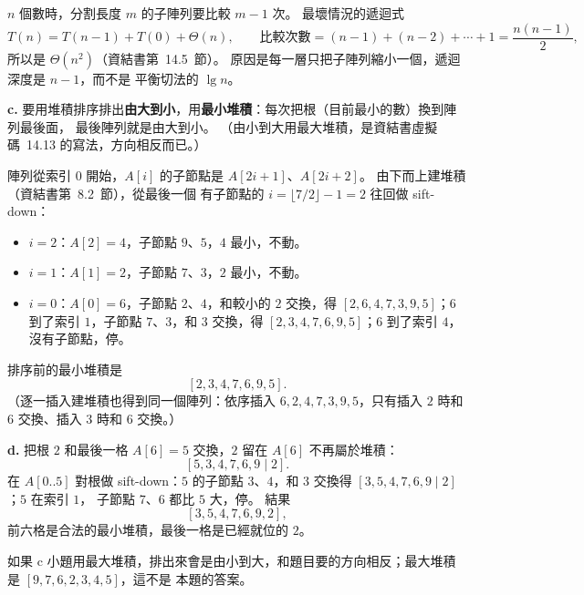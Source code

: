\begin{pastsoln}
$n$ 個數時，分割長度 $m$ 的子陣列要比較 $m - 1$ 次。 最壞情況的遞迴式
\[
T(n) = T(n - 1) + T(0) + \Theta(n), \qquad
\text{比較次數} = (n - 1) + (n - 2) + \cdots + 1 = \frac{n(n - 1)}{2},
\]
所以是 $\Theta(n^2)$（資結書第~14.5~節）。 原因是每一層只把子陣列縮小一個，遞迴深度是 $n - 1$，而不是
平衡切法的 $\lg n$。

\textbf{c.} 要用堆積排序排出\textbf{由大到小}，用\textbf{最小堆積}：每次把根（目前最小的數）換到陣列最後面，
最後陣列就是由大到小。 （由小到大用最大堆積，是資結書虛擬碼~14.13 的寫法，方向相反而已。）

陣列從索引 $0$ 開始，$A[i]$ 的子節點是 $A[2i + 1]$、$A[2i + 2]$。 由下而上建堆積（資結書第~8.2~節），從最後一個
有子節點的 $i = \lfloor 7/2 \rfloor - 1 = 2$ 往回做 sift-down：
\begin{itemize}
\item $i = 2$：$A[2] = 4$，子節點 $9$、$5$，$4$ 最小，不動。
\item $i = 1$：$A[1] = 2$，子節點 $7$、$3$，$2$ 最小，不動。
\item $i = 0$：$A[0] = 6$，子節點 $2$、$4$，和較小的 $2$ 交換，得 $[2, 6, 4, 7, 3, 9, 5]$；$6$ 到了索引 $1$，子節點
$7$、$3$，和 $3$ 交換，得 $[2, 3, 4, 7, 6, 9, 5]$；$6$ 到了索引 $4$，沒有子節點，停。
\end{itemize}
排序前的最小堆積是
\[
[2, 3, 4, 7, 6, 9, 5].
\]
（逐一插入建堆積也得到同一個陣列：依序插入 $6, 2, 4, 7, 3, 9, 5$，只有插入 $2$ 時和 $6$ 交換、插入 $3$ 時和 $6$
交換。）

\textbf{d.} 把根 $2$ 和最後一格 $A[6] = 5$ 交換，$2$ 留在 $A[6]$ 不再屬於堆積：
\[
[5, 3, 4, 7, 6, 9 \mid 2].
\]
在 $A[0..5]$ 對根做 sift-down：$5$ 的子節點 $3$、$4$，和 $3$ 交換得 $[3, 5, 4, 7, 6, 9 \mid 2]$；$5$ 在索引 $1$，
子節點 $7$、$6$ 都比 $5$ 大，停。 結果
\[
[3, 5, 4, 7, 6, 9, 2],
\]
前六格是合法的最小堆積，最後一格是已經就位的 $2$。

如果 c 小題用最大堆積，排出來會是由小到大，和題目要的方向相反；最大堆積是 $[9, 7, 6, 2, 3, 4, 5]$，這不是
本題的答案。
\end{pastsoln}

